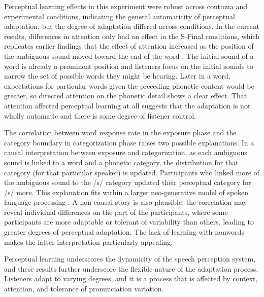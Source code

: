 \documentclass[a4paper,11pt,twocolumn]{article}
\begin{document}
Perceptual learning effects in this experiment were robust across continua and experimental conditions, indicating the general automaticity of perceptual adaptation, but the degree of adaptation differed across conditions. In the current results, differences in attention only had an effect in the S-Final conditions, which replicates earlier findings that the effect of attention increased as the position of the ambiguous sound moved toward the end of the word \cite{Pitt2012}.  The initial sound of a word is already a prominent position and listeners focus on the initial sounds to narrow the set of possible words they might be hearing. Later in a word, expectations for particular words given the preceding phonetic content would be greater, so directed attention on the phonetic detail shows a clear effect.  That attention affected perceptual learning at all suggests that the adaptation is not wholly automatic and there is some degree of listener control.

The correlation between word response rate in the exposure phase and the category boundary in categorization phase raises two possible explanations. In a causal interpretation between exposure and categorization, as each ambiguous sound is linked to a word and a phonetic category, the distribution for that category (for that particular speaker) is updated. Participants who linked more of the ambiguous sound to the /s/ category updated their perceptual category for /s/ more. This explanation fits within a larger neo-generative model of spoken language processing \cite{Pierrehumbert2002}.  A non-causal story is also plausible:  the correlation may reveal individual differences on the part of the participants, where some participants are more adaptable or tolerant of variability than others, leading to greater degrees of perceptual adaptation. The lack of learning with nonwords \cite{Norris2003} makes the latter interpretation particularly appealing. 

Perceptual learning underscores the dynamicity of the speech perception system, and these results further underscore the flexible nature of the adaptation process. Listeners adapt to varying degrees, and it is a process that is affected by context, attention, and tolerance of pronunciation variation.
 



\end{document}
